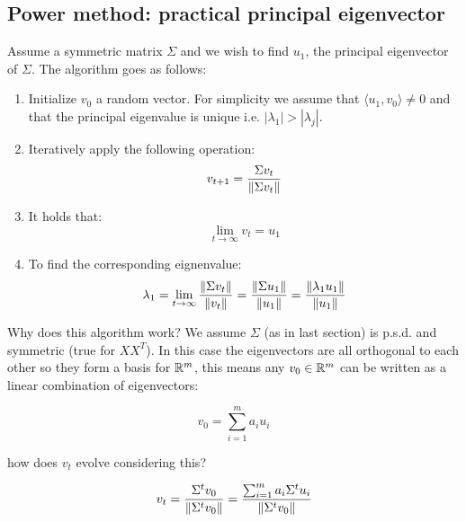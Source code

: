 \subsection{Power method: practical principal eigenvector}
Assume a symmetric matrix $\Sigma$ and we wish 
to find $u_1$, the principal eigenvector of $\Sigma$. 
The algorithm goes as follows:
\begin{enumerate}
	\item Initialize $v_0$ a random vector. For simplicity 
	we assume that $\langle u_1,v_0\rangle \neq 0$ and that 
	the principal eigenvalue is unique i.e. $|\lambda_1| > |\lambda_j|$.
	
	\item Iteratively apply the following operation:
	\begin{equation}
	v_{t+1} = \frac{\Sigma v_t}{\left\lVert\Sigma v_t\right\rVert}
	\end{equation}
	 
	\item It holds that:
	\begin{equation}
	\lim_{t\rightarrow\infty} v_t = u_1
	\end{equation}
	 
	\item To find the corresponding eignenvalue:
	\begin{equation}
	\lambda_1 
		= \lim_{t\rightarrow\infty} \frac{\left\lVert\Sigma v_t\right\rVert}{\left\lVert v_t\right\rVert} 
		= \frac{\left\lVert\Sigma u_1\right\rVert}{\left\lVert u_1\right\rVert} 
		= \frac{\left\lVert\lambda_1u_1\right\rVert}{\left\lVert u_1\right\rVert} 
	\end{equation}
\end{enumerate}

\noindent
Why does this algorithm work? We assume $\Sigma$ (as in last
section) is p.s.d. and symmetric (true for $XX^T$). In this 
case the eigenvectors are all orthogonal to each other so they 
form a basis for $\mathbb{R}^m$, this means any $v_0 \in \mathbb{R}^m$ 
can be written as a linear combination of eigenvectors:

\begin{equation}
\label{eq:eigenbasis}
v_0 = \sum_{i=1}^{m} a_i u_i
\end{equation}

\noindent 
how does $v_t$ evolve considering this?

\begin{equation}
\label{eq:evolve_power}
v_{t} 
	= \frac{\Sigma^t v_0}{\left\lVert\Sigma^t v_0\right\rVert} 
	= \frac{\sum_{i=1}^{m}a_i\Sigma^t u_i}{\left\lVert\Sigma^t v_0\right\rVert}
\end{equation}


